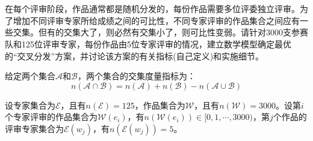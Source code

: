 \documentclass[12pt, onecolumn]{article}
\title{\normf{基于连续时间的LiDAR/Camera/IMU的时空标定方法}}
\author{\normf{陈烁龙}}
\date{\normf{\today}}
\newcommand\normf{\fangsong}
\begin{document}
	
	\maketitle
	\thispagestyle{empty}
	\clearpage
	
	\tableofcontents
	\newpage
	\listoffigures
	\newpage
	\listoftables
	
	\clearpage
	\setcounter{page}{1}
	
	\section{\normf{交叉分配方案}}
	\normf
	在每个评审阶段，作品通常都是随机分发的，每份作品需要多位评委独立评审。为了增加不同评审专家所给成绩之间的可比性，不同专家评审的作品集合之间应有一些交集。但有的交集大了，则必然有交集小了，则可比性变弱。请针对3000支参赛队和125位评审专家，每份作品由5位专家评审的情况，建立数学模型确定最优的“交叉分发”方案，并讨论该方案的有关指标(自己定义)和实施细节。
	
	给定两个集合$\mathcal{A}$和$\mathcal{B}$，两个集合的交集度量指标为：
	\begin{equation*}
	n\left( \mathcal{A}\cap\mathcal{B}\right) =n\left(\mathcal{A} \right)+ n\left(\mathcal{B} \right)-n\left( \mathcal{A}\cup\mathcal{B}\right)
	\end{equation*}
	
	设专家集合为$\mathcal{E}$，且有$n(\mathcal{E})=125$，作品集合为$\mathcal{W}$，且有$n(\mathcal{W})=3000$。设第$i$个专家评审的作品集合为$\mathcal{W}(e_i)$，有$n(\mathcal{W}(e_i))\in[0,1,\cdots,3000)$，第$j$个作品的评审专家集合为$\mathcal{E}(w_j)$，有$n(\mathcal{E}(w_j))=5$。
	
\end{document}

